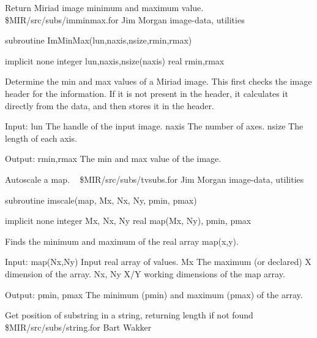 %
\noindent Return Miriad image minimum and maximum value.
\newline \ 
\newline {} \$MIR/src/subs/imminmax.for
\newline {} Jim Morgan
\newline {} image-data, utilities
\par{\tenpoint
{\eightpoint\begintt
        subroutine ImMinMax(lun,naxis,nsize,rmin,rmax)

        implicit none
        integer lun,naxis,nsize(naxis)
        real rmin,rmax

  Determine the min and max values of a Miriad image. This first checks
  the image header for the information. If it is not present in the header,
  it calculates it directly from the data, and then stores it in the header.

  Input:
    lun        The handle of the input image.
    naxis      The number of axes.
    nsize      The length of each axis.

  Output:
    rmin,rmax  The min and max value of the image.
\endtt}
\par}
%
\noindent Autoscale a map.
\newline \ 
\newline {} \$MIR/src/subs/tvsubs.for
\newline {} Jim Morgan
\newline \abox{Keywords:} image-data, utilities
\par{\tenpoint
{\eightpoint\begintt
      subroutine imscale(map, Mx, Nx, Ny, pmin, pmax)

      implicit none
      integer Mx, Nx, Ny
      real map(Mx, Ny), pmin, pmax

  Finds the minimum and maximum of the real array map(x,y).

  Input:
    map(Nx,Ny)   Input real array of values.
    Mx           The maximum (or declared) X dimension of the array.
    Nx, Ny       X/Y working dimensions of the map array.

  Output:
    pmin, pmax   The minimum (pmin) and maximum (pmax) of the array.
\endtt}
\par}
%
\noindent Get position of substring in a string, returning length if not found
\newline \ 
\newline {} \$MIR/src/subs/string.for
\newline \abox{Responsible:} Bart Wakker
